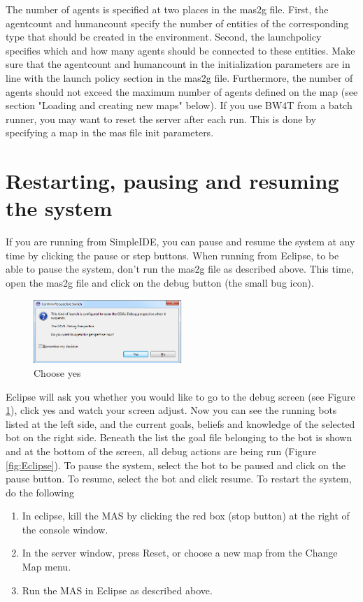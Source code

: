\documentclass[11pt,a4paper]{article}
\begin{document}
The number of agents is specified at two places in the mas2g file. First, the agentcount and humancount specify the number of entities of the corresponding type that should be created in the environment. Second, the launchpolicy specifies which and how many agents should be connected to these entities. Make sure that the agentcount and humancount in the initialization parameters are in line with the launch policy section in the mas2g file. Furthermore, the number of agents should not exceed the maximum number of agents defined on the map (see section "Loading and creating new maps" below).
If you use BW4T from a batch runner, you may want to reset the server after each run. This is done by specifying a map in the mas file init parameters.

\section{Restarting, pausing and resuming the system}
If you are running from SimpleIDE, you can pause and resume the system at any time by clicking the pause or step buttons. When running from Eclipse, to be able to pause the system, don't run the mas2g file as described above.
This time, open the mas2g file and click on the debug button (the small bug icon).

\begin{figure}
  \begin{center}
    \includegraphics[width=0.5\textwidth]{debug.png}
  \end{center}
  \caption{Choose yes}\label{fig:EclipseDebug}
\end{figure}
Eclipse will ask you whether you would like to go to the debug screen (see Figure \ref{fig:EclipseDebug}), click yes and watch your screen adjust.
Now you can see the running bots listed at the left side, and the current goals, beliefs and knowledge of the selected bot on the right side. Beneath the list the goal file belonging to the bot is shown and at the bottom of the screen, all debug actions are being run (Figure \ref{fig:Eclipse}).
To pause the system, select the bot to be paused and click on the pause button. To resume, select the bot and click resume.
To restart the system, do the following
\begin{enumerate}
\item In eclipse, kill the MAS by clicking the red box (stop button) at the right of the console window.
\item In the server window, press Reset, or choose a new map from the Change Map menu.
\item Run the MAS in Eclipse as described above.
\end{enumerate}
\end{document}
